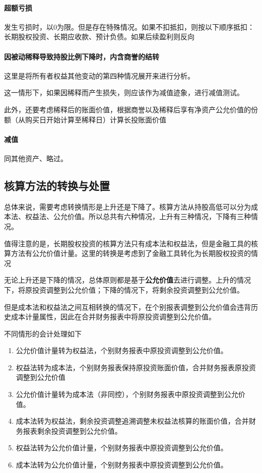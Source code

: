\documentclass[UTF8,12pt]{ctexart}
\numberwithin{equation}{section} %
\numberwithin{figure}{section}
\numberwithin{table}{section}
\begin{document}
	\paragraph{超额亏损}
	发生亏损时，以0为限。但是存在特殊情况。如果不扣抵扣，则按以下顺序抵扣：长期股权投资、长期应收款、预计负债。如果后续盈利则反向
	
	\paragraph{因被动稀释导致持股比例下降时，内含商誉的结转} 这里是将所有者权益其他变动的第四种情况展开来进行分析。
	
	这一情形下，如果因稀释而产生损失，则应该作为减值迹象，进行减值测试。
	
	此外，还要考虑稀释后的账面价值，根据商誉以及稀释后享有净资产公允价值的份额（从购买日开始计算至稀释日）计算长投账面价值
	
	\paragraph{减值}
	同其他资产、略过。
	
	\subsection{核算方法的转换与处置}
	总体来说，需要考虑转换情形是上升还是下降了。核算方法从持股高低可以分为成本法、权益法、公允价值。所以总共有六种情况，上升有三种情况，下降有三种情况。
	
	值得注意的是，长期股权投资的核算方法只有成本法和权益法，但是金融工具的核算方法有公允价值计量。这里的转换是考虑到了金融工具转化为长期股权投资的情况
	
	无论上升还是下降的情况，总体原则都是基于\textbf{公允价值}去进行调整。上升的情况下，将原投资调整到公允价值；下降的情况下，将剩余投资调整到公允价值。
	
	但是成本法和权益法之间互相转换的情况下，在个别报表调整到公允价值会违背历史成本计量属性，因此在合并财务报表中将原投资调整到公允价值。
	
	不同情形的会计处理如下
	\begin{enumerate}
		\item 公允价值计量转为权益法，个别财务报表中原投资调整到公允价值。
		
		\item 权益法转为成本法，个别财务报表保持原投资账面价值，合并财务报表原投资调整到公允价值
		
		\item 公允价值计量转为成本法（非同控），个别财务报表中原投资调整到公允价值。
		
		\item 成本法转为权益法，剩余投资调整追溯调整未权益法核算的账面价值，合并财务报表剩余投资调整到公允价值。
		
		\item 权益法转为公允价值计量，个别财务报表中原投资调整到公允价值。
		
		\item 成本法转为公允价值计量，个别财务报表中原投资调整到公允价值。
	\end{enumerate}
	
\end{document}
